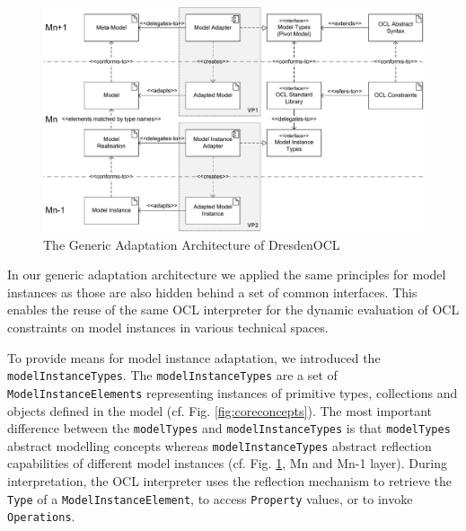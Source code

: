 		\begin{figure}[!t]
				\includegraphics[width=1.00\textwidth]{figures/modeladaptation.pdf}
			\caption{The Generic Adaptation Architecture of DresdenOCL
			}
			\label{fig:modeladaptation}			
		\end{figure}
		
	In our generic adaptation architecture we applied the same principles for model instances as those are also hidden behind a set of common
	interfaces. This enables the reuse of the same OCL interpreter for the dynamic
	evaluation of OCL constraints on model instances in various technical spaces.
	
	To provide means for model instance adaptation, we introduced the
	\texttt{model\-Instance\-Types}. The \texttt{modelInstanceTypes} are a set of \texttt{ModelInstanceElements}
	representing instances of primitive types, 
	collections and objects defined in the model (cf. Fig. \ref{fig:coreconcepts}). 
  The most important difference between the \texttt{modelTypes} and \texttt{modelInstanceTypes}
	is that \texttt{modelTypes} abstract modelling concepts whereas \texttt{modelInstanceTypes} abstract 
	reflection capabilities of different model instances (cf. Fig. \ref{fig:modeladaptation}, Mn and Mn-1 layer).
	During interpretation, the OCL interpreter uses the reflection mechanism to
	retrieve the \texttt{Type} of a \texttt{ModelInstanceElement}, to access \texttt{Property}
	values, or to invoke \texttt{Operations}.
	
